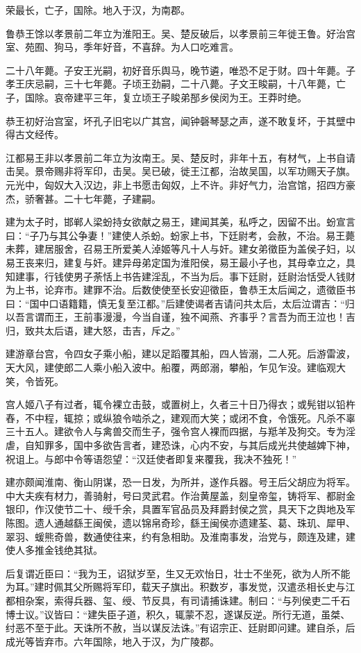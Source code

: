 \documentclass[]{article}
\begin{document}
荣最长，亡子，国除。地入于汉，为南郡。

鲁恭王馀以孝景前二年立为淮阳王。吴、楚反破后，以孝景前三年徙王鲁。好治宫室、苑囿、狗马，季年好音，不喜辞。为人口吃难言。

二十八年薨。子安王光嗣，初好音乐舆马，晚节遴，唯恐不足于财。四十年薨。子孝王庆忌嗣，三十七年薨。子顷王劲嗣，二十八薨。子文王睃嗣，十八年薨，亡子，国除。哀帝建平三年，复立顷王子睃弟郚乡侯闵为王。王莽时绝。

恭王初好治宫室，坏孔子旧宅以广其宫，闻钟磬琴瑟之声，遂不敢复坏，于其壁中得古文经传。

江都易王非以孝景前二年立为汝南王。吴、楚反时，非年十五，有材气，上书自请击吴。景帝赐非将军印，击吴。吴已破，徙王江都，治故吴国，以军功赐天子旗。元光中，匈奴大入汉边，非上书愿击匈奴，上不许。非好气力，治宫馆，招四方豪杰，骄奢甚。二十七年薨，子建嗣。

建为太子时，邯郸人梁蚡持女欲献之易王，建闻其美，私呼之，因留不出。蚡宣言曰：``子乃与其公争妻！''建使人杀蚡。蚡家上书，下廷尉考，会赦，不治。易王薨未葬，建居服舍，召易王所爱美人淖姬等凡十人与奸。建女弟徵臣为盖侯子妇，以易王丧来归，建复与奸。建异母弟定国为淮阳侯，易王最小子也，其母幸立之，具知建事，行钱使男子荼恬上书告建淫乱，不当为后。事下廷尉，廷尉治恬受人钱财为上书，论弃市。建罪不治。后数使使至长安迎徵臣，鲁恭王太后闻之，遗徵臣书曰：``国中口语籍籍，慎无复至江都。''后建使谒者吉请问共太后，太后泣谓吉：``归以吾言谓而王，王前事漫漫，今当自谨，独不闻燕、齐事乎？言吾为而王泣也！吉归，致共太后语，建大怒，击吉，斥之。''

建游章台宫，令四女子乘小船，建以足蹈覆其船，四人皆溺，二人死。后游雷波，天大风，建使郎二人乘小船入波中。船覆，两郎溺，攀船，乍见乍没。建临观大笑，令皆死。

宫人姬八子有过者，辄令裸立击鼓，或置树上，久者三十日乃得衣；或髡钳以铅杵舂，不中程，辄掠；或纵狼令啮杀之，建观而大笑；或闭不食，令饿死。凡杀不辜三十五人。建欲令人与禽兽交而生子，强令宫人裸而四据，与羝羊及狗交。专为淫虐，自知罪多，国中多欲告言者，建恐诛，心内不安，与其后成光共使越婢下神，祝诅上。与郎中令等语怨望：``汉廷使者即复来覆我，我决不独死！''

建亦颇闻淮南、衡山阴谋，恐一日发，为所并，遂作兵器。号王后父胡应为将军。中大夫疾有材力，善骑射，号曰灵武君。作治黄屋盖，刻皇帝玺，铸将军、都尉金银印，作汉使节二十、绶千余，具置军官品员及拜爵封侯之赏，具天下之舆地及军陈图。遗人通越繇王闽侯，遗以锦帛奇珍，繇王闽侯亦遗建荃、葛、珠玑、犀甲、翠羽、蝯熊奇兽，数通使往来，约有急相助。及淮南事发，治党与，颇连及建，建使人多推金钱绝其狱。

后复谓近臣曰：``我为王，诏狱岁至，生又无欢怡日，壮士不坐死，欲为人所不能为耳。''建时佩其父所赐将军印，载天子旗出。积数岁，事发觉，汉遣丞相长史与江都相杂案，索得兵器、玺、绶、节反具，有司请捕诛建。制曰：``与列侯吏二千石博士议。''议皆曰：``建失臣子道，积久，辄蒙不忍，遂谋反逆。所行无道，虽桀、纣恶不至于此。天诛所不赦，当以谋反法诛。''有诏宗正、廷尉即问建。建自杀，后成光等皆弃市。六年国除，地入于汉，为广陵郡。
\end{document}
